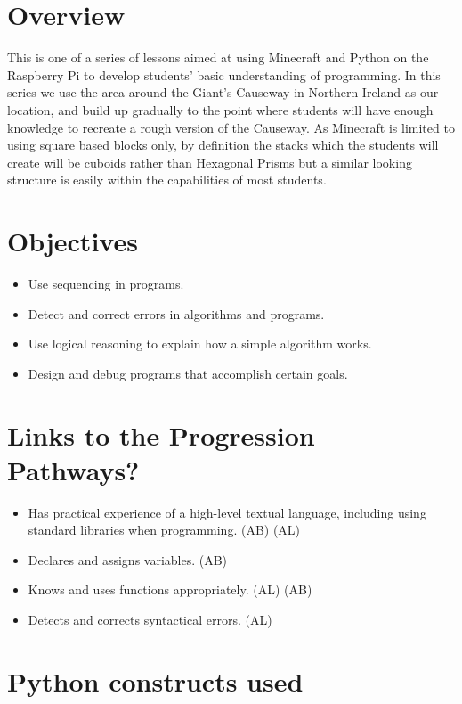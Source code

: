 \documentclass{geocraft-lesson-plan}
\begin{document}
\subtitle{Part 1 - Sequencing}

\section*{Overview} This is one of a series of lessons aimed at using Minecraft and Python on the Raspberry Pi to
develop students' basic understanding of programming. In this series we use the area around the Giant's Causeway in 
Northern Ireland as our location, and build up gradually to the point where students will have enough knowledge to
recreate a rough version of the Causeway. As Minecraft is limited to using square based blocks only, by definition the
stacks which the students will create will be cuboids rather than Hexagonal Prisms but a similar looking structure is
easily within the capabilities of most students.

\section*{Objectives}

\begin{itemize}
\item Use sequencing in programs.
\item Detect and correct errors in algorithms and programs.
\item Use logical reasoning to explain how a simple algorithm works.
\item Design and debug programs that accomplish certain goals.
\end{itemize}

\section*{Links to the Progression Pathways?}

\begin{itemize}
\item Has practical experience of a high-level textual language, including using standard libraries when
  programming. (AB) (AL) 
\item Declares and assigns variables. (AB)
\item Knows and uses functions appropriately. (AL) (AB)
\item Detects and corrects syntactical errors. (AL)
\end{itemize}

\section*{Python constructs used}
\end{document}
